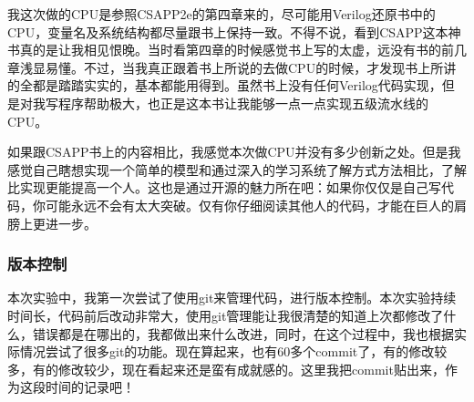 \documentclass[12pt]{article}
\begin{document}
\begin{CJK*}{GB}{gbsn}
我这次做的CPU是参照CSAPP2e的第四章来的，尽可能用Verilog还原书中的CPU，变量名及系统结构都尽量跟书上保持一致。不得不说，看到CSAPP这本神书真的是让我相见恨晚。当时看第四章的时候感觉书上写的太虚，远没有书的前几章浅显易懂。不过，当我真正跟着书上所说的去做CPU的时候，才发现书上所讲的全都是踏踏实实的，基本都能用得到。虽然书上没有任何Verilog代码实现，但是对我写程序帮助极大，也正是这本书让我能够一点一点实现五级流水线的CPU。

如果跟CSAPP书上的内容相比，我感觉本次做CPU并没有多少创新之处。但是我感觉自己瞎想实现一个简单的模型和通过深入的学习系统了解方式方法相比，了解比实现更能提高一个人。这也是通过开源的魅力所在吧：如果你仅仅是自己写代码，你可能永远不会有太大突破。仅有你仔细阅读其他人的代码，才能在巨人的肩膀上更进一步。

\subsubsection{版本控制}\label{ux7248ux672cux63a7ux5236}

本次实验中，我第一次尝试了使用git来管理代码，进行版本控制。本次实验持续时间长，代码前后改动非常大，使用git管理能让我很清楚的知道上次都修改了什么，错误都是在哪出的，我都做出来什么改进，同时，在这个过程中，我也根据实际情况尝试了很多git的功能。现在算起来，也有60多个commit了，有的修改较多，有的修改较少，现在看起来还是蛮有成就感的。这里我把commit贴出来，作为这段时间的记录吧！


\end{CJK*}
\end{document}
